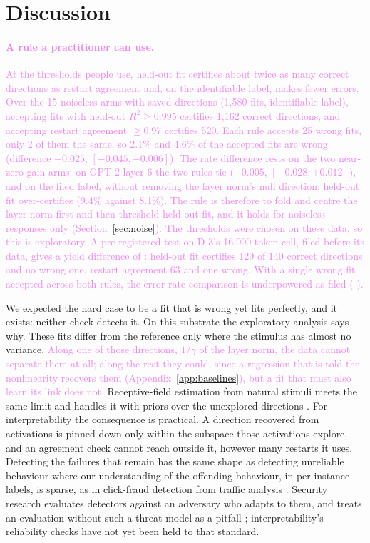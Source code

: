 \documentclass[10pt]{article}
\newcommand{\draft}[1]{\textcolor{violet}{#1}}
\begin{document}
\section{Discussion}
\label{sec:discussion}
\draft{\paragraph{A rule a practitioner can use.} At the thresholds people use, held-out fit
certifies about twice as many correct directions as restart agreement and, on the identifiable
label, makes fewer errors.
Over the 15 noiseless arms with saved directions (1{,}580 fits, identifiable label), accepting
fits with held-out $R^2 \geq 0.995$ certifies 1{,}162 correct directions, and accepting restart
agreement $\geq 0.97$ certifies 520. Each rule accepts 25 wrong fits, only 2 of them the same, so
2.1\% and 4.6\% of the accepted fits are wrong (difference $-0.025$, $[-0.045, -0.006]$). The rate
difference rests on the two near-zero-gain arms: on GPT-2 layer 6 the two rules tie ($-0.005$,
$[-0.028, +0.012]$), and on the filed label, without removing the layer norm's null direction,
held-out fit over-certifies (9.4\% against 8.1\%). The rule is therefore to fold and centre the
layer norm first and then threshold held-out fit, and it holds for noiseless responses only
(Section~\ref{sec:noise}). The thresholds were chosen on these data, so this is exploratory. A
pre-registered test on D-3's 16{,}000-token cell, filed before its data, gives a yield difference
of \dThreeYield{} \dThreeYieldCI{}: held-out fit certifies 129 of 140 correct directions and no
wrong one, restart agreement 63 and one wrong. With a single wrong fit accepted across both rules,
the error-rate comparison is underpowered as filed (\dThreeFcr{} \dThreeFcrCI{}).}

We expected the hard case to be a fit that is wrong yet fits perfectly, and it exists:
neither check detects it. On this substrate the exploratory analysis says why. These fits
differ from the reference only where the stimulus has almost no variance. \draft{Along one of
those directions, $1/\gamma$ of the layer norm, the data cannot separate them at all; along the
rest they could, since a regression that is told the nonlinearity recovers them
(Appendix~\ref{app:baselines}), but a fit that must also learn its link does not.} Receptive-field estimation from natural stimuli meets the same limit
and handles it with priors over the unexplored directions \citep{park2011localized}. For
interpretability the consequence is practical. A direction recovered from activations is
pinned down only within the subspace those activations explore, and an agreement check
cannot reach outside it, however many restarts it uses. Detecting the failures that remain has
the same shape as detecting unreliable behaviour where our understanding of the offending
behaviour, in per-instance labels, is sparse, as in click-fraud detection from traffic
analysis \citep{nagaraja2019clicktok}. Security research evaluates detectors against an adversary who adapts
to them, and treats an evaluation without such a threat model as a pitfall
\citep{gardiner2016security,arp2022dos}; interpretability's reliability checks have not yet
been held to that standard.
\end{document}
